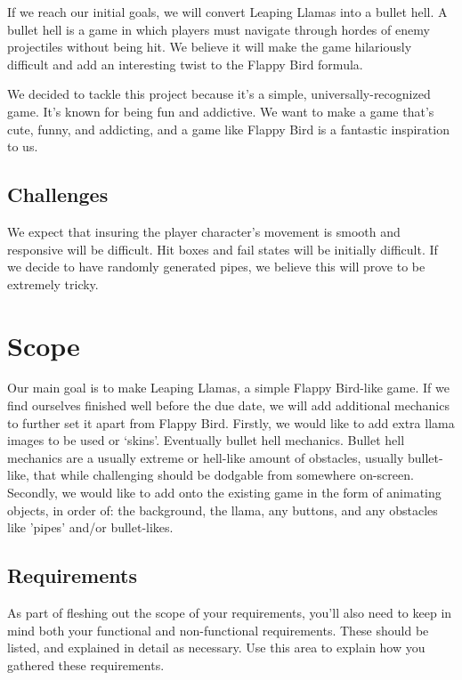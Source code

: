 \documentclass[10pt,conference,onecolumn,compsoc]{IEEEtran}
\begin{document}
	If we reach our initial goals, we will convert Leaping Llamas into a bullet hell. A bullet hell is a game in which players must navigate through hordes of enemy projectiles without being hit. We believe it will make the game hilariously difficult and add an interesting twist to the Flappy Bird formula.

	We decided to tackle this project because it's a simple, universally-recognized game. It's known for being fun and addictive. We want to make a game that's cute, funny, and addicting, and a game like Flappy Bird is a fantastic inspiration to us.

\subsection{Challenges}
	We expect that insuring the player character's movement is smooth and responsive will be difficult. Hit boxes and fail states will be initially difficult. If we decide to have randomly generated pipes, we believe this will prove to be extremely tricky.

\section{Scope}
	Our main goal is to make Leaping Llamas, a simple Flappy Bird-like game. If we find ourselves finished well before the due date, we will add additional mechanics to further set it apart from Flappy Bird. Firstly, we would like to add extra llama images to be used or `skins'. Eventually bullet hell mechanics. Bullet hell mechanics are a usually extreme or hell-like amount of obstacles, usually bullet-like, that while challenging should be dodgable from somewhere on-screen.  Secondly, we would like to add onto the existing game in the form of animating objects, in order of: the background, the llama, any buttons, and any obstacles like 'pipes' and/or bullet-likes. 

\subsection{Requirements}
	As part of fleshing out the scope of your requirements, you'll also need to keep in mind both your functional and non-functional requirements.  These should be listed, and explained in detail as necessary.  Use this area to explain how you gathered these requirements.
\end{document}
